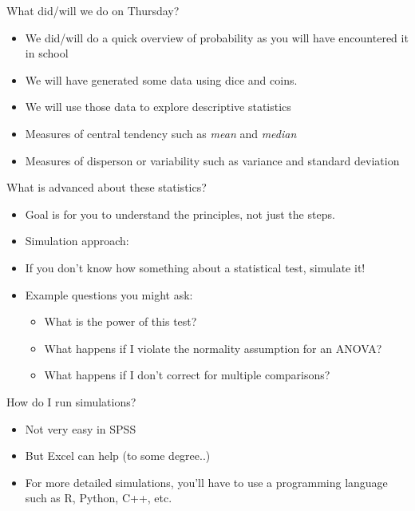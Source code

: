 \begin{frame}{What did/will we do on Thursday?}

\begin{itemize}
\itemsep1pt\parskip0pt
\item
  We did/will do a quick overview of probability as you will have
  encountered it in school
\item
  We will have generated some data using dice and coins.
\item
  We will use those data to explore descriptive statistics
\item
  Measures of central tendency such as \emph{mean} and \emph{median}
\item
  Measures of disperson or variability such as variance and standard
  deviation
\end{itemize}

\end{frame}

\begin{frame}{What is advanced about these statistics?}

\begin{itemize}
\itemsep1pt\parskip0pt
\item
  Goal is for you to understand the principles, not just the steps.
\item
  Simulation approach:
\item
  If you don't know how something about a statistical test, simulate it!
\item
  Example questions you might ask:

  \begin{itemize}
  \itemsep1pt\parskip0pt
  \item
    What is the power of this test?
  \item
    What happens if I violate the normality assumption for an ANOVA?
  \item
    What happens if I don't correct for multiple comparisons?
  \end{itemize}
\end{itemize}

\end{frame}

\begin{frame}{How do I run simulations?}

\begin{itemize}
\itemsep1pt\parskip0pt
\item
  Not very easy in SPSS
\item
  But Excel can help (to some degree..)
\item
  For more detailed simulations, you'll have to use a programming
  language such as R, Python, C++, etc.
\end{itemize}

\end{frame}

